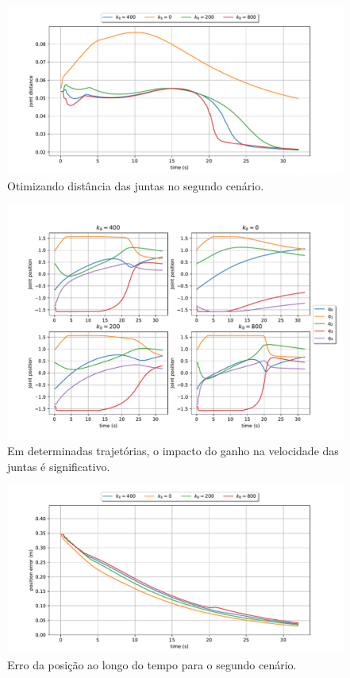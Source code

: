 \begin{figure}
	\centering
	\includegraphics[width=\textwidth]{./Images/2024-07-02-14-04-38/metric_joint_distance.pdf}
	\caption{Otimizando distância das juntas no segundo cenário.}\label{fig:exp3-metric}
\end{figure}

\begin{figure}
	\centering
	\includegraphics[width=\textwidth]{./Images/2024-07-02-14-04-38/joint_states_joint_distance.pdf}
	\caption{Em determinadas trajetórias, o impacto do ganho na velocidade das juntas é significativo.}\label{fig:exp3-joint-states}
\end{figure}

\begin{figure}
	\centering
	\includegraphics[width=\textwidth]{./Images/2024-07-02-14-04-38/position_error_joint_distance.pdf}
	\caption{Erro da posição ao longo do tempo para o segundo cenário.}\label{fig:exp3-error}
\end{figure}

